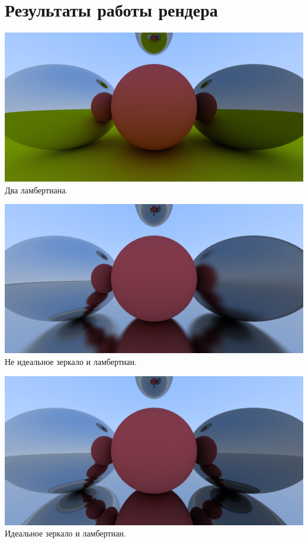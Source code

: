 \documentclass[titlepage]{article}
\begin{document}
\section{Результаты работы рендера}
\begin{center}
	\includegraphics[scale=0.1]{fiveSpheres.jpg}
	\\Два ламбертиана.
	\\
\end{center}
\begin{center}
	\includegraphics[scale=0.2]{fuzemetal.jpg}
	\\Не идеальное зеркало и ламбертиан.
\end{center}
\begin{center}
	\includegraphics[scale=0.2]{metal.jpg}
	\\Идеальное зеркало и ламбертиан.
\end{center}
\end{document}

